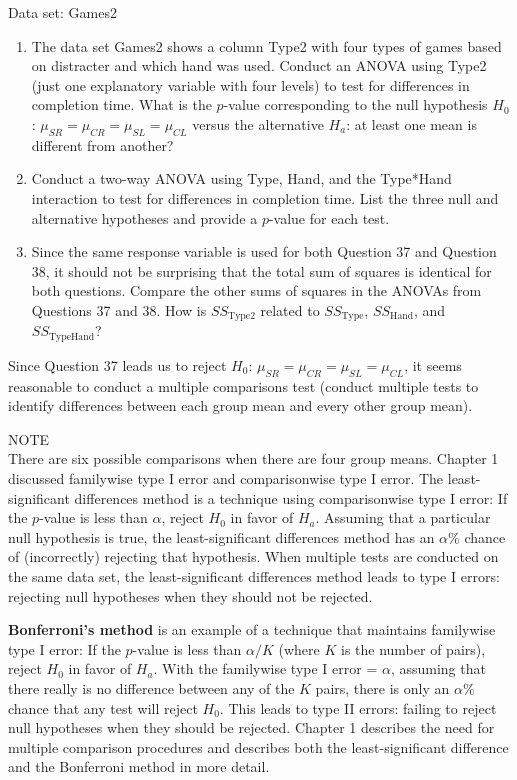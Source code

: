 \documentclass[
]{report}
\theoremstyle{definition}
\theoremstyle{definition}
\theoremstyle{definition}
\theoremstyle{definition}
\theoremstyle{remark}
\begin{document}
Data set: Games2

\begin{enumerate}
\def\labelenumi{\arabic{enumi}.}
\setcounter{enumi}{36}
\item
  The data set Games2 shows a column Type2 with four types of games based on distracter and which hand was used. Conduct an ANOVA using Type2 (just one explanatory variable with four levels) to test for differences in completion time. What is the \(p\)-value corresponding to the null hypothesis \(H_0\): \(\mu_{SR} = \mu_{CR} = \mu_{SL} = \mu_{CL}\) versus the alternative \(H_a\): at least one mean is different from another?
\item
  Conduct a two-way ANOVA using Type, Hand, and the Type*Hand interaction to test for differences in completion time. List the three null and alternative hypotheses and provide a \(p\)-value for each test.
\item
  Since the same response variable is used for both Question 37 and Question 38, it should not be surprising that the total sum of squares is identical for both questions. Compare the other sums of squares in the ANOVAs from Questions 37 and 38. How is \(SS_{\text{Type2}}\) related to \(SS_{\text{Type}}\), \(SS_{\text{Hand}}\), and \(SS_{\text{TypeHand}}\)?
\end{enumerate}

Since Question 37 leads us to reject \(H_0\): \(\mu_{SR} = \mu_{CR} = \mu_{SL} = \mu_{CL}\), it seems reasonable to conduct a multiple comparisons test (conduct multiple tests to identify differences between each group mean and every other group mean).

NOTE\\
There are six possible comparisons when there are four group means. Chapter 1 discussed familywise type I error and comparisonwise type I error. The least-significant differences method is a technique using comparisonwise type I error: If the \(p\)-value is less than \(\alpha\), reject \(H_0\) in favor of \(H_a\). Assuming that a particular null hypothesis is true, the least-significant differences method has an \(\alpha\%\) chance of (incorrectly) rejecting that hypothesis. When multiple tests are conducted on the same data set, the least-significant differences method leads to type I errors: rejecting null hypotheses when they should not be rejected.

\textbf{Bonferroni's method} is an example of a technique that maintains familywise type I error: If the \(p\)-value is less than \(\alpha/K\) (where \(K\) is the number of pairs), reject \(H_0\) in favor of \(H_a\). With the familywise type I error = \(\alpha\), assuming that there really is no difference between any of the \(K\) pairs, there is only an \(\alpha\%\) chance that any test will reject \(H_0\). This leads to type II errors: failing to reject null hypotheses when they should be rejected. Chapter 1 describes the need for multiple comparison procedures and describes both the least-significant difference and the Bonferroni method in more detail.
\end{document}
